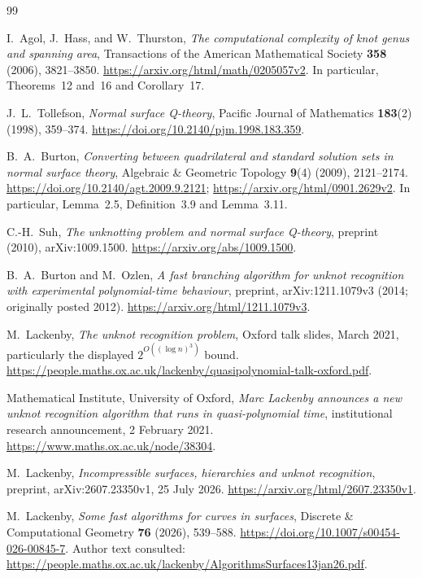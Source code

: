 \begin{thebibliography}{99}
\small\raggedright
{}

I.~Agol, J.~Hass, and W.~Thurston,
\emph{The computational complexity of knot genus and spanning area},
Transactions of the American Mathematical Society \textbf{358} (2006),
3821--3850.
\url{https://arxiv.org/html/math/0205057v2}.
In particular, Theorems~12 and~16 and Corollary~17.

J.~L.~Tollefson, \emph{Normal surface Q-theory},
Pacific Journal of Mathematics \textbf{183}(2) (1998), 359--374.
\url{https://doi.org/10.2140/pjm.1998.183.359}.

B.~A.~Burton,
\emph{Converting between quadrilateral and standard solution sets in normal
surface theory}, Algebraic \& Geometric Topology \textbf{9}(4) (2009),
2121--2174.
\url{https://doi.org/10.2140/agt.2009.9.2121};
\url{https://arxiv.org/html/0901.2629v2}.
In particular, Lemma~2.5, Definition~3.9 and Lemma~3.11.

C.-H.~Suh, \emph{The unknotting problem and normal surface Q-theory},
preprint (2010), arXiv:1009.1500.
\url{https://arxiv.org/abs/1009.1500}.

B.~A.~Burton and M.~Ozlen,
\emph{A fast branching algorithm for unknot recognition with experimental
polynomial-time behaviour}, preprint, arXiv:1211.1079v3 (2014;
originally posted 2012).
\url{https://arxiv.org/html/1211.1079v3}.

M.~Lackenby, \emph{The unknot recognition problem},
Oxford talk slides, March 2021, particularly the displayed
$2^{O((\log n)^3)}$ bound.
\url{https://people.maths.ox.ac.uk/lackenby/quasipolynomial-talk-oxford.pdf}.

Mathematical Institute, University of Oxford,
\emph{Marc Lackenby announces a new unknot recognition algorithm that
runs in quasi-polynomial time}, institutional research announcement,
2 February 2021.
\url{https://www.maths.ox.ac.uk/node/38304}.

M.~Lackenby, \emph{Incompressible surfaces, hierarchies and unknot recognition},
preprint, arXiv:2607.23350v1, 25 July 2026.
\url{https://arxiv.org/html/2607.23350v1}.

M.~Lackenby, \emph{Some fast algorithms for curves in surfaces},
Discrete \& Computational Geometry \textbf{76} (2026), 539--588.
\url{https://doi.org/10.1007/s00454-026-00845-7}.
Author text consulted:
\url{https://people.maths.ox.ac.uk/lackenby/AlgorithmsSurfaces13jan26.pdf}.


\end{thebibliography}
